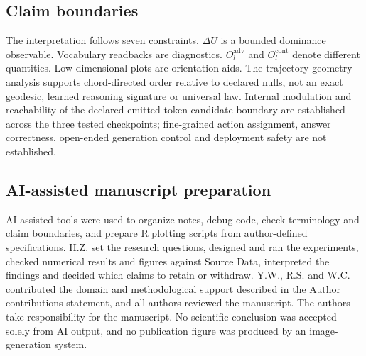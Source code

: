\documentclass[11pt]{article}
\begin{document}
\subsection*{Claim boundaries}
The interpretation follows seven constraints. \(\Delta U\) is a bounded dominance observable. Vocabulary readbacks are diagnostics. \(O_l^{\mathrm{adv}}\) and \(O_l^{\mathrm{cont}}\) denote different quantities. Low-dimensional plots are orientation aids. The trajectory-geometry analysis supports chord-directed order relative to declared nulls, not an exact geodesic, learned reasoning signature or universal law. Internal modulation and reachability of the declared emitted-token candidate boundary are established across the three tested checkpoints; fine-grained action assignment, answer correctness, open-ended generation control and deployment safety are not established.

\subsection*{AI-assisted manuscript preparation}
AI-assisted tools were used to organize notes, debug code, check terminology and claim boundaries, and prepare R plotting scripts from author-defined specifications. H.Z. set the research questions, designed and ran the experiments, checked numerical results and figures against Source Data, interpreted the findings and decided which claims to retain or withdraw. Y.W., R.S. and W.C. contributed the domain and methodological support described in the Author contributions statement, and all authors reviewed the manuscript. The authors take responsibility for the manuscript. No scientific conclusion was accepted solely from AI output, and no publication figure was produced by an image-generation system.
\end{document}
